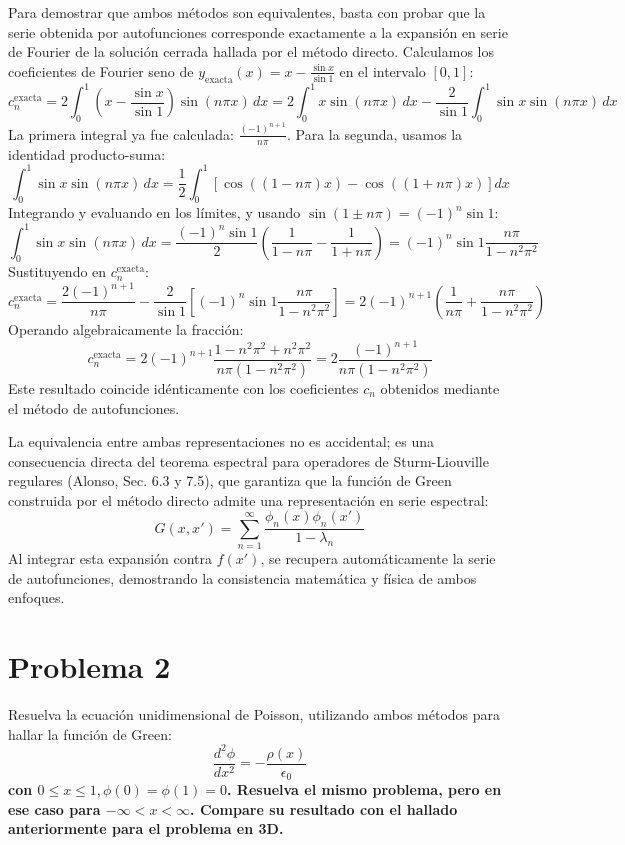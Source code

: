 \documentclass[a4paper]{article}
\begin{document}
Para demostrar que ambos métodos son equivalentes, basta con probar que la serie obtenida por autofunciones corresponde exactamente a la expansión en serie de Fourier de la solución cerrada hallada por el método directo. Calculamos los coeficientes de Fourier seno de $y_{\text{exacta}}(x) = x - \frac{\sin x}{\sin 1}$ en el intervalo $[0, 1]$:
$$ c_n^{\text{exacta}} = 2 \int_0^1 \left( x - \frac{\sin x}{\sin 1} \right) \sin(n\pi x) \, dx = 2 \int_0^1 x \sin(n\pi x) \, dx - \frac{2}{\sin 1} \int_0^1 \sin x \sin(n\pi x) \, dx $$
La primera integral ya fue calculada: $\frac{(-1)^{n+1}}{n\pi}$. Para la segunda, usamos la identidad producto-suma:
$$ \int_0^1 \sin x \sin(n\pi x) \, dx = \frac{1}{2} \int_0^1 \left[ \cos((1-n\pi)x) - \cos((1+n\pi)x) \right] dx $$
Integrando y evaluando en los límites, y usando $\sin(1 \pm n\pi) = (-1)^n \sin 1$:
$$ \int_0^1 \sin x \sin(n\pi x) \, dx = \frac{(-1)^n \sin 1}{2} \left( \frac{1}{1-n\pi} - \frac{1}{1+n\pi} \right) = (-1)^n \sin 1 \frac{n\pi}{1 - n^2\pi^2} $$
Sustituyendo en $c_n^{\text{exacta}}$:
$$ c_n^{\text{exacta}} = \frac{2(-1)^{n+1}}{n\pi} - \frac{2}{\sin 1} \left[ (-1)^n \sin 1 \frac{n\pi}{1 - n^2\pi^2} \right] = 2(-1)^{n+1} \left( \frac{1}{n\pi} + \frac{n\pi}{1 - n^2\pi^2} \right) $$
Operando algebraicamente la fracción:
$$ c_n^{\text{exacta}} = 2(-1)^{n+1} \frac{1 - n^2\pi^2 + n^2\pi^2}{n\pi(1 - n^2\pi^2)} = 2 \frac{(-1)^{n+1}}{n\pi(1 - n^2\pi^2)} $$
Este resultado coincide idénticamente con los coeficientes $c_n$ obtenidos mediante el método de autofunciones. 

La equivalencia entre ambas representaciones no es accidental; es una consecuencia directa del teorema espectral para operadores de Sturm-Liouville regulares (Alonso, Sec. 6.3 y 7.5), que garantiza que la función de Green construida por el método directo admite una representación en serie espectral:
$$ G(x, x') = \sum_{n=1}^\infty \frac{\phi_n(x)\phi_n(x')}{1 - \lambda_n} $$
Al integrar esta expansión contra $f(x')$, se recupera automáticamente la serie de autofunciones, demostrando la consistencia matemática y física de ambos enfoques.

\section{Problema 2} 
Resuelva la ecuación unidimensional de Poisson, utilizando ambos métodos para hallar la función de Green:
$$ \frac{d^2\phi}{dx^2} = -\frac{\rho(x)}{\epsilon_0} $$
\textbf{con $0 \le x \le 1, \phi(0) = \phi(1) = 0$. Resuelva el mismo problema, pero en ese caso para $-\infty < x < \infty$. Compare su resultado con el hallado anteriormente para el problema en 3D.}
\end{document}
